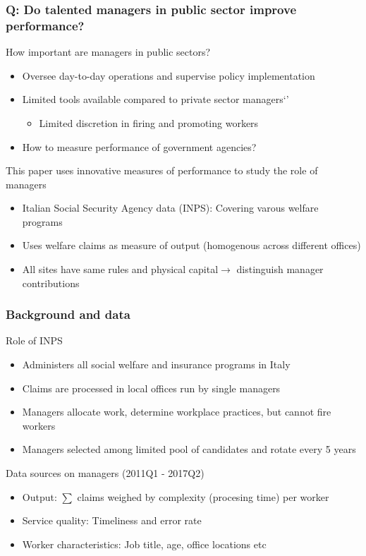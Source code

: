 \documentclass[aspectratio=169]{beamer}
\begin{document}
\begin{frame}
\frametitle{Q: Do talented managers in public sector improve performance?} 
How important are managers in public sectors?
\begin{itemize}\setlength\itemsep{3pt}
\item Oversee day-to-day operations and supervise policy implementation 
\item Limited tools available compared to private sector managers`'
\begin{itemize}
\item Limited discretion in firing and promoting workers
\end{itemize}
\item How to measure performance of government agencies?
\end{itemize}\medskip
This paper uses innovative measures of performance to study the role of managers
\begin{itemize}\setlength\itemsep{3pt}
\item Italian Social Security Agency data (INPS): Covering varous welfare programs
\item Uses welfare claims as measure of output (homogenous across different offices)
\item All sites have same rules and physical capital$\to$ distinguish manager contributions
\end{itemize}\medskip
\end{frame}

\begin{frame}
\frametitle{Background and data} 
Role of INPS 
\begin{itemize}\setlength\itemsep{3pt}
\item Administers all social welfare and insurance programs in Italy 
\item Claims are processed in local offices run by single managers 
\item Managers allocate work, determine workplace practices, but cannot fire workers
\item Managers selected among limited pool of candidates and rotate every 5 years 
\end{itemize}\medskip
Data sources on managers (2011Q1 - 2017Q2)
\begin{itemize}\setlength\itemsep{3pt}
\item Output: $\sum$ claims weighed by complexity (procesing time) per worker
\item Service quality: Timeliness and error rate
\item Worker characteristics: Job title, age, office locations etc
\end{itemize}
\end{frame}
\end{document}
